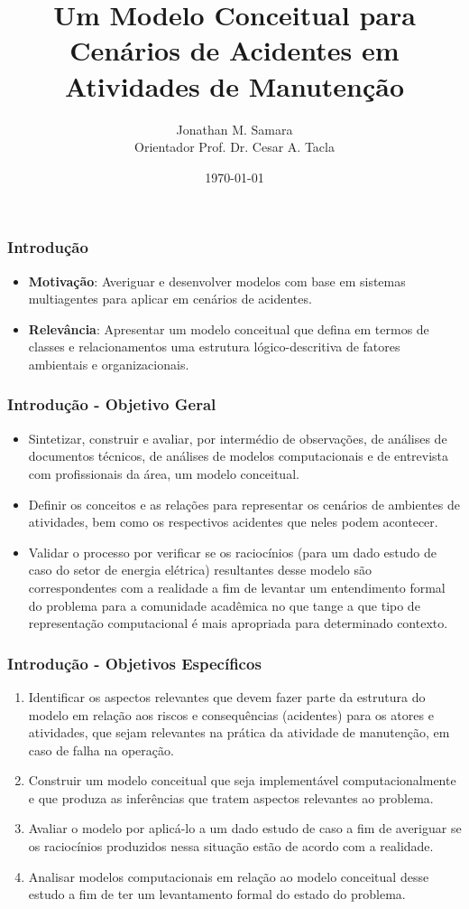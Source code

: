 \documentclass{beamer}
\title{Um Modelo Conceitual para Cenários de Acidentes em Atividades de Manutenção} %
\author{Jonathan M. Samara \\ Orientador Prof. Dr. Cesar A. Tacla} %
\institute[UTFPR] %
{
Universidade Tecnológica Federal do Paraná \\ %
\medskip
}
\date{\today} %
\begin{document}
\begin{frame}
\titlepage %
\end{frame}

\begin{frame}
\frametitle{Introdução} %
	\begin{itemize}
			\item \textbf{Motivação}: Averiguar e desenvolver modelos com base em sistemas multiagentes para aplicar em cenários de acidentes. 
			\item \textbf{Relevância}: Apresentar um modelo conceitual que defina em termos de classes e relacionamentos uma estrutura lógico-descritiva de fatores ambientais e organizacionais.    
	\end{itemize}
\end{frame}


\begin{frame}
\frametitle{Introdução - Objetivo Geral} %
	\begin{itemize}
		\item Sintetizar, construir e avaliar, por intermédio de observações, de análises de documentos técnicos, de análises de modelos computacionais e de entrevista com profissionais da área, um modelo conceitual.
		\item Definir os conceitos e as relações para representar os cenários de ambientes de atividades, bem como os respectivos acidentes que neles podem acontecer.
		\item Validar o processo por verificar se os raciocínios (para um dado estudo de caso do setor de energia elétrica) resultantes desse modelo são correspondentes com a realidade a fim de levantar um entendimento formal do problema para a comunidade acadêmica no que tange a que tipo de representação computacional é mais apropriada para determinado contexto. 
	\end{itemize}
\end{frame}

\begin{frame}
\frametitle{Introdução - Objetivos Específicos}
	\begin{enumerate}
    	\item Identificar os aspectos relevantes que devem fazer parte da estrutura do modelo em relação aos 	riscos e consequências (acidentes) para os atores e atividades, que sejam relevantes na prática da 	atividade de manutenção, em caso de falha na operação. 
    	\item Construir um modelo conceitual que seja implementável computacionalmente e que produza as 	inferências que tratem aspectos relevantes ao problema.
    	\item Avaliar o modelo por aplicá-lo a um dado estudo de caso a fim de averiguar se os raciocínios 	produzidos nessa situação estão de acordo com a realidade.  
    	\item Analisar modelos computacionais em relação ao modelo conceitual desse estudo a fim de ter um 	levantamento formal do estado do problema. 
	\end{enumerate}
\end{frame}
\end{document}
